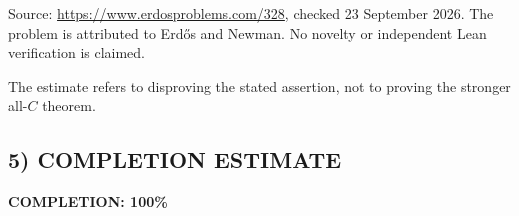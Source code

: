 Source: \url{https://www.erdosproblems.com/328}, checked 23 September 2026. The problem is attributed to Erd\H{o}s and Newman. No novelty or independent Lean verification is claimed.

The estimate refers to disproving the stated assertion, not to proving the stronger all-$C$ theorem.
\subsection*{5) COMPLETION ESTIMATE}
\textbf{COMPLETION: 100\%}
